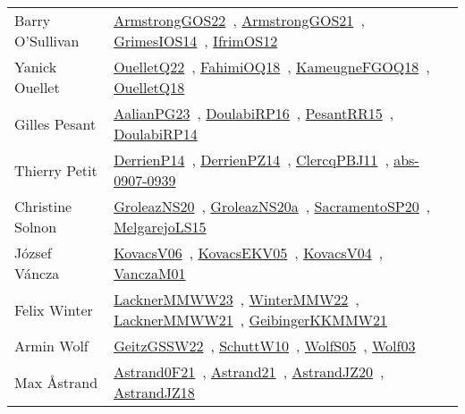 {\begin{longtable}{p{4cm}p{20cm}}
Barry O'Sullivan & \href{works/ArmstrongGOS22.pdf}{ArmstrongGOS22}~\cite{ArmstrongGOS22}, \href{works/ArmstrongGOS21.pdf}{ArmstrongGOS21}~\cite{ArmstrongGOS21}, \href{works/GrimesIOS14.pdf}{GrimesIOS14}~\cite{GrimesIOS14}, \href{works/IfrimOS12.pdf}{IfrimOS12}~\cite{IfrimOS12}\\
Yanick Ouellet & \href{works/OuelletQ22.pdf}{OuelletQ22}~\cite{OuelletQ22}, \href{works/FahimiOQ18.pdf}{FahimiOQ18}~\cite{FahimiOQ18}, \href{works/KameugneFGOQ18.pdf}{KameugneFGOQ18}~\cite{KameugneFGOQ18}, \href{works/OuelletQ18.pdf}{OuelletQ18}~\cite{OuelletQ18}\\
Gilles Pesant & \href{works/AalianPG23.pdf}{AalianPG23}~\cite{AalianPG23}, \href{works/DoulabiRP16.pdf}{DoulabiRP16}~\cite{DoulabiRP16}, \href{works/PesantRR15.pdf}{PesantRR15}~\cite{PesantRR15}, \href{works/DoulabiRP14.pdf}{DoulabiRP14}~\cite{DoulabiRP14}\\
Thierry Petit & \href{works/DerrienP14.pdf}{DerrienP14}~\cite{DerrienP14}, \href{works/DerrienPZ14.pdf}{DerrienPZ14}~\cite{DerrienPZ14}, \href{works/ClercqPBJ11.pdf}{ClercqPBJ11}~\cite{ClercqPBJ11}, \href{works/abs-0907-0939.pdf}{abs-0907-0939}~\cite{abs-0907-0939}\\
Christine Solnon & \href{works/GroleazNS20.pdf}{GroleazNS20}~\cite{GroleazNS20}, \href{works/GroleazNS20a.pdf}{GroleazNS20a}~\cite{GroleazNS20a}, \href{works/SacramentoSP20.pdf}{SacramentoSP20}~\cite{SacramentoSP20}, \href{works/MelgarejoLS15.pdf}{MelgarejoLS15}~\cite{MelgarejoLS15}\\
J{\'{o}}zsef V{\'{a}}ncza & \href{works/KovacsV06.pdf}{KovacsV06}~\cite{KovacsV06}, \href{works/KovacsEKV05.pdf}{KovacsEKV05}~\cite{KovacsEKV05}, \href{works/KovacsV04.pdf}{KovacsV04}~\cite{KovacsV04}, \href{works/VanczaM01.pdf}{VanczaM01}~\cite{VanczaM01}\\
Felix Winter & \href{works/LacknerMMWW23.pdf}{LacknerMMWW23}~\cite{LacknerMMWW23}, \href{works/WinterMMW22.pdf}{WinterMMW22}~\cite{WinterMMW22}, \href{works/LacknerMMWW21.pdf}{LacknerMMWW21}~\cite{LacknerMMWW21}, \href{works/GeibingerKKMMW21.pdf}{GeibingerKKMMW21}~\cite{GeibingerKKMMW21}\\
Armin Wolf & \href{works/GeitzGSSW22.pdf}{GeitzGSSW22}~\cite{GeitzGSSW22}, \href{works/SchuttW10.pdf}{SchuttW10}~\cite{SchuttW10}, \href{works/WolfS05.pdf}{WolfS05}~\cite{WolfS05}, \href{works/Wolf03.pdf}{Wolf03}~\cite{Wolf03}\\
Max {\AA}strand & \href{works/Astrand0F21.pdf}{Astrand0F21}~\cite{Astrand0F21}, \href{}{Astrand21}~\cite{Astrand21}, \href{works/AstrandJZ20.pdf}{AstrandJZ20}~\cite{AstrandJZ20}, \href{works/AstrandJZ18.pdf}{AstrandJZ18}~\cite{AstrandJZ18}\\

\end{longtable}}
